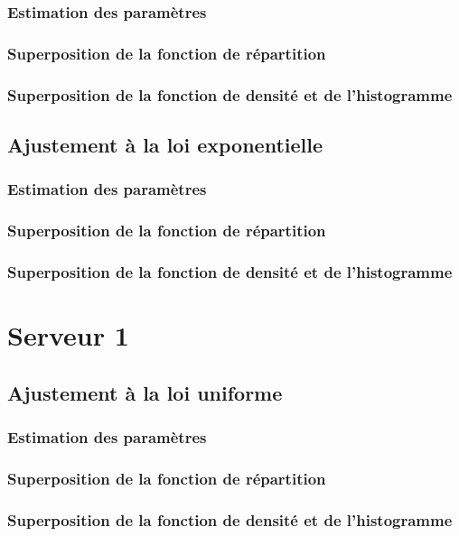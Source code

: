 \documentclass{article}
\begin{document}
\subsubsection{Estimation des paramètres}
\subsubsection{Superposition de la fonction de répartition}
\subsubsection{Superposition de la fonction de densité et de l'histogramme}

\subsection {Ajustement à la loi exponentielle}

\subsubsection{Estimation des paramètres}
\subsubsection{Superposition de la fonction de répartition}
\subsubsection{Superposition de la fonction de densité et de l'histogramme}

\section{Serveur 1}

\subsection{Ajustement à la loi uniforme}

\subsubsection{Estimation des paramètres}
\subsubsection{Superposition de la fonction de répartition}
\subsubsection{Superposition de la fonction de densité et de l'histogramme}
\end{document}
